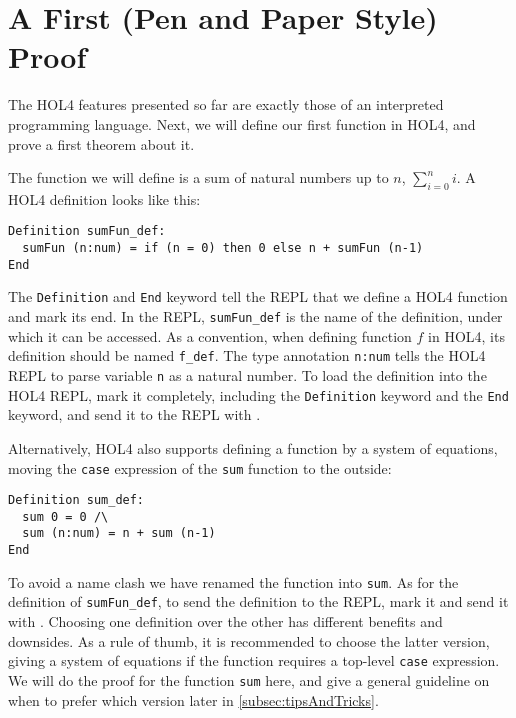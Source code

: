 \section{A First (Pen and Paper Style) Proof}\label{sec:hol_ex1}
%
The HOL4 features presented so far are exactly those of an interpreted
programming language.
Next, we will define our first function in HOL4, and prove a first theorem about
it.

The function we will define is a sum of natural numbers up to $n$,
$\sum_{i=0}^n i$.
A HOL4 definition looks like this:

\begin{lstlisting}
Definition sumFun_def:
  sumFun (n:num) = if (n = 0) then 0 else n + sumFun (n-1)
End
\end{lstlisting}

The \lstinline{Definition} and \lstinline{End} keyword tell the REPL that we
define a HOL4 function and mark its end.
In the REPL, \lstinline{sumFun_def} is the name of the definition, under which it
can be accessed.
As a convention, when defining function $f$ in HOL4, its definition should be
named \lstinline{f_def}.
The type annotation \lstinline{n:num} tells the HOL4 REPL to parse variable \texttt{n}
as a natural number.
To load the definition into the HOL4 REPL, mark it completely, including the \lstinline{Definition}
keyword and the \lstinline{End} keyword, and send it to the REPL with .

Alternatively, HOL4 also supports defining a function by a system of equations,
moving the \texttt{case} expression of the \lstinline{sum} function to the
outside:
%
\begin{lstlisting}
Definition sum_def:
  sum 0 = 0 /\
  sum (n:num) = n + sum (n-1)
End
\end{lstlisting}

To avoid a name clash we have renamed the function into \lstinline{sum}.
As for the definition of \lstinline{sumFun_def}, to send the definition to the REPL,
mark it and send it with \ekey{M-h M-r}.
Choosing one definition over the other has different benefits and downsides.
As a rule of thumb, it is recommended to choose the latter version, giving a
system of equations if the function requires a top-level \texttt{case}
expression.
We will do the proof for the function \texttt{sum} here, and give a general
guideline on when to prefer which version later in \autoref{subsec:tipsAndTricks}.

